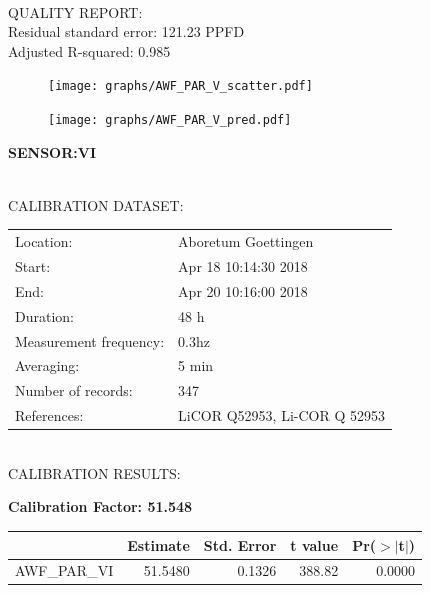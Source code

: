 \documentclass[oneside]{report}
\begin{document}
\hrulefill\\
QUALITY REPORT:\\
Residual standard error: 121.23 PPFD\\
Adjusted R-squared: 0.985



\begin{figure}[H]
  \centering
  \texttt{[image: graphs/AWF\_PAR\_V\_scatter.pdf]}
\end{figure}




\begin{figure}[H]
  \centering
  \texttt{[image: graphs/AWF\_PAR\_V\_pred.pdf]}
\end{figure}

\pagebreak


\begin{center}
\large{\textbf{SENSOR:VI}}\\
\end{center}

\hrulefill\\
CALIBRATION DATASET:\\
\begin{table}[h!]
  \centering
  \label{tab:table1}
  \begin{tabular}{ll}
    Location: & Aboretum Goettingen\\ 
    
    
    Start:  & Apr 18 10:14:30 2018 \\
    End:   & Apr 20 10:16:00 2018\\ 
    Duration: & 48 h\\
    Measurement frequency: & 0.3hz\\
    Averaging:  &5 min\\
    Number of records: & 347 \\
    References: & LiCOR Q52953, Li-COR Q 52953 \\
  \end{tabular}
\end{table}

\hrulefill\\
CALIBRATION RESULTS:\\


\begin{center}
\textbf{\large{Calibration Factor: 51.548}}\\
\end{center}
\begin{table}[ht]
\centering
\begin{tabular}{rrrrr}
  \hline
 & Estimate & Std. Error & t value & Pr($>$$|$t$|$) \\ 
  \hline
AWF\_PAR\_VI & 51.5480 & 0.1326 & 388.82 & 0.0000 \\ 
   \hline
\end{tabular}
\end{table}
\end{document}
